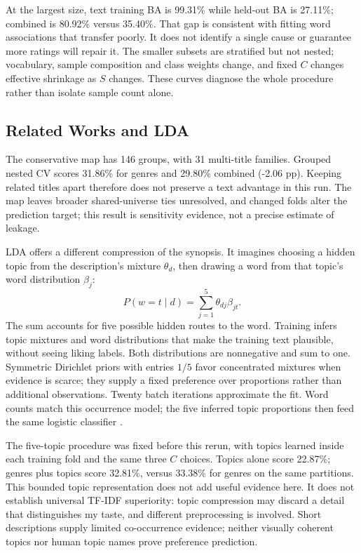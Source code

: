 \documentclass[11pt,letterpaper]{article}
\begin{document}
At the largest size, text training BA is 99.31\% while held-out BA is 27.11\%; combined is 80.92\% versus 35.40\%. That gap is consistent with fitting word associations that transfer poorly. It does not identify a single cause or guarantee more ratings will repair it. The smaller subsets are stratified but not nested; vocabulary, sample composition and class weights change, and fixed $C$ changes effective shrinkage as $S$ changes. These curves diagnose the whole procedure rather than isolate sample count alone.


\subsection{Related Works and LDA}

The conservative map has 146 groups, with 31 multi-title families. Grouped nested CV scores 31.86\% for genres and 29.80\% combined (-2.06 pp). Keeping related titles apart therefore does not preserve a text advantage in this run. The map leaves broader shared-universe ties unresolved, and changed folds alter the prediction target; this result is sensitivity evidence, not a precise estimate of leakage.


LDA offers a different compression of the synopsis. It imagines choosing a hidden topic from the description's mixture $\theta_d$, then drawing a word from that topic's word distribution $\beta_j$:
\[
P(w=t\mid d)=\sum_{j=1}^{5}\theta_{dj}\beta_{jt}.
\]
The sum accounts for five possible hidden routes to the word. Training infers topic mixtures and word distributions that make the training text plausible, without seeing liking labels. Both distributions are nonnegative and sum to one. Symmetric Dirichlet priors with entries $1/5$ favor concentrated mixtures when evidence is scarce; they supply a fixed preference over proportions rather than additional observations. Twenty batch iterations approximate the fit. Word counts match this occurrence model; the five inferred topic proportions then feed the same logistic classifier \cite{blei,topics}.

The five-topic procedure was fixed before this rerun, with topics learned inside each training fold and the same three $C$ choices. Topics alone score 22.87\%; genres plus topics score 32.81\%, versus 33.38\% for genres on the same partitions. This bounded topic representation does not add useful evidence here. It does not establish universal TF-IDF superiority: topic compression may discard a detail that distinguishes my taste, and different preprocessing is involved. Short descriptions supply limited co-occurrence evidence; neither visually coherent topics nor human topic names prove preference prediction.
\end{document}
